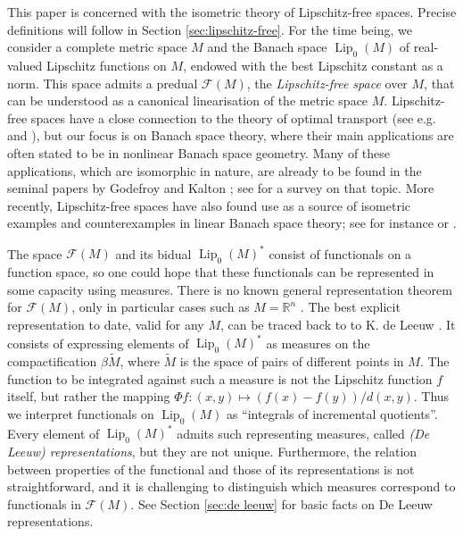 \documentclass[a4paper,10pt]{amsart}
\DeclareMathOperator{\Lip}{Lip}                             %
\newcommand{\RR}{\mathbb{R}}                                %
\newcommand{\dual}[1]{{#1}^\ast}                            %
\newcommand{\lipfree}[1]{\mathcal{F}({#1})}                 %
\newcommand{\wt}[1]{\widetilde{#1}}                         %
\newcommand{\bwt}[1]{\beta\wt{#1}}                          %
\theoremstyle{plain}
\theoremstyle{definition}
\theoremstyle{remark}
\begin{document}
This paper is concerned with the isometric theory of Lipschitz-free spaces. Precise definitions will follow in Section \ref{sec:lipschitz-free}. For the time being, we consider a complete metric space $M$ and the Banach space $\Lip_0(M)$ of real-valued Lipschitz functions on $M$, endowed with the best Lipschitz constant as a norm. This space admits a predual $\lipfree{M}$, the \emph{Lipschitz-free space} over $M$, that can be understood as a canonical linearisation of the metric space $M$. Lipschitz-free spaces have a close connection to the theory of optimal transport (see e.g. \cite[Section 1.2]{APS1} and \cite{OO1}), but our focus is on Banach space theory, where their main applications are often stated to be in nonlinear Banach space geometry. Many of these applications, which are isomorphic in nature, are already to be found in the seminal papers by Godefroy and Kalton \cite{GK,Kalton04}; see \cite{Godefroy_survey} for a survey on that topic. More recently, Lipschitz-free spaces have also found use as a source of isometric examples and counterexamples in linear Banach space theory; see for instance \cite[Section 2]{AALMPPV1} or \cite{Basset}.

The space $\lipfree{M}$ and its bidual $\Lip_0(M)^*$ consist of functionals on a function space, so one could hope that these functionals can be represented in some capacity using measures. There is no known general representation theorem for $\lipfree{M}$, only in particular cases such as $M=\RR^n$ \cite{CKK2}. The best explicit representation to date, valid for any $M$, can be traced back to to K. de Leeuw \cite{deLeeuw}. It consists of expressing elements of $\dual{\Lip_0(M)}$ as measures on the compactification $\bwt{M}$, where $\wt{M}$ is the space of pairs of different points in $M$. The function to be integrated against such a measure is not the Lipschitz function $f$ itself, but rather the mapping $\Phi f:(x,y)\mapsto (f(x)-f(y))/d(x,y)$. Thus we interpret functionals on $\Lip_0(M)$ as ``integrals of incremental quotients''. Every element of $\dual{\Lip_0(M)}$ admits such representing measures, called \emph{(De Leeuw) representations}, but they are not unique. Furthermore, the relation between properties of the functional and those of its representations is not straightforward, and it is challenging to distinguish which measures correspond to functionals in $\lipfree{M}$. See Section \ref{sec:de leeuw} for basic facts on De Leeuw representations.
\end{document}
